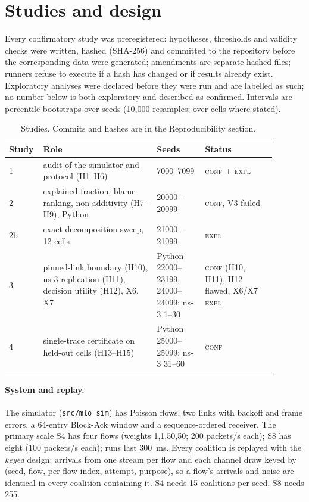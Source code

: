 \documentclass[11pt]{article}
\newcommand{\tagC}{\textsc{conf}}
\newcommand{\tagE}{\textsc{expl}}
\begin{document}
\section{Studies and design}
Every confirmatory study was preregistered: hypotheses, thresholds and validity checks were written, hashed (SHA-256) and committed to the repository before the corresponding data were generated; amendments are separate hashed files; runners refuse to execute if a hash has changed or if results already exist. Exploratory analyses were declared before they were run and are labelled as such; no number below is both exploratory and described as confirmed. Intervals are percentile bootstraps over seeds (10{,}000 resamples; over cells where stated).
\begin{table}[h]
\centering\footnotesize
\begin{tabular}{p{0.07\linewidth}p{0.4\linewidth}p{0.17\linewidth}p{0.25\linewidth}}
\toprule
Study & Role & Seeds & Status \\
\midrule
1 & audit of the simulator and protocol (H1--H6) & 7000--7099 & \tagC{} + \tagE{} \\
2 & explained fraction, blame ranking, non-additivity (H7--H9), Python & 20000--20099 & \tagC{}, V3 failed \\
2b & exact decomposition sweep, 12 cells & 21000--21099 & \tagE{} \\
3 & pinned-link boundary (H10), ns-3 replication (H11), decision utility (H12), X6, X7 & Python 22000--23199, 24000--24099; ns-3 1--30 & \tagC{} (H10, H11), H12 flawed, X6/X7 \tagE{} \\
4 & single-trace certificate on held-out cells (H13--H15) & Python 25000--25099; ns-3 31--60 & \tagC{} \\
\bottomrule
\end{tabular}
\caption{Studies. Commits and hashes are in the Reproducibility section.}
\end{table}

\paragraph{System and replay.} The simulator (\texttt{src/mlo\_sim}) has Poisson flows, two links with backoff and frame errors, a 64-entry Block-Ack window and a sequence-ordered receiver. The primary scale S4 has four flows (weights 1,1,50,50; 200 packets/s each); S8 has eight (100 packets/s each); runs last 300~ms. Every coalition is replayed with the \emph{keyed} design: arrivals from one stream per flow and each channel draw keyed by (seed, flow, per-flow index, attempt, purpose), so a flow's arrivals and noise are identical in every coalition containing it. S4 needs 15 coalitions per seed, S8 needs 255.
\end{document}
